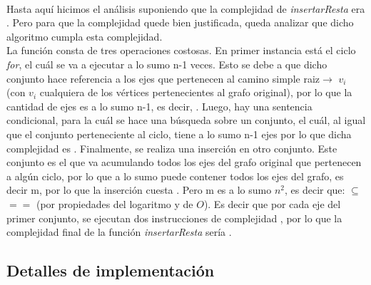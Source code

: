 \paragraph{}
Hasta aquí hicimos el análisis suponiendo que la complejidad de \textit{insertarResta} era . Pero para que la complejidad quede bien justificada, queda analizar que dicho algoritmo cumpla esta complejidad.\\
La función consta de tres operaciones costosas. En primer instancia está el ciclo \textit{for}, el cuál se va a ejecutar a lo sumo n-1 veces. Esto se debe a que dicho conjunto hace referencia a los ejes que pertenecen al camino simple raiz$\rightarrow$ $v_i$ (con $v_i$ cualquiera de los vértices pertenecientes al grafo original), por lo que la cantidad de ejes es a lo sumo n-1, es decir, . Luego, hay una sentencia condicional, para la cuál se hace una búsqueda sobre un conjunto, el cuál, al igual que el conjunto perteneciente al ciclo, tiene a lo sumo n-1 ejes por lo que dicha complejidad es . Finalmente, se realiza una inserción en otro conjunto. Este conjunto es el que va acumulando todos los ejes del grafo original que pertenecen a algún ciclo, por lo que a lo sumo puede contener todos los ejes del grafo, es decir m, por lo que la inserción cuesta . Pero m es a lo sumo $n^2$, es decir que:  $\subseteq$  $==$  (por propiedades del logaritmo y de $O$). Es decir que por cada eje del primer conjunto, se ejecutan dos instrucciones de complejidad , por lo que la complejidad final de la función \textit{insertarResta} sería .


\subsection{Detalles de implementación}
\label{imp2}

